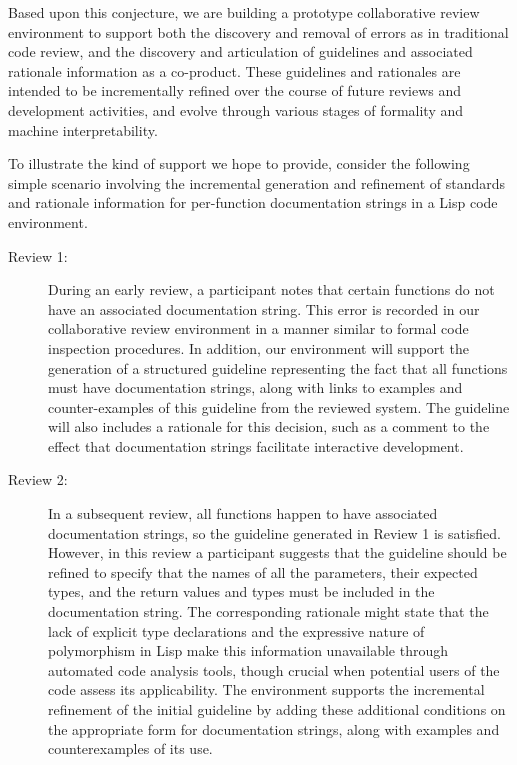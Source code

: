 Based upon this conjecture, we are building a prototype collaborative
review environment to support both the discovery and removal of errors
as in traditional code review, and the discovery and articulation of
guidelines and associated rationale information as a co-product.
These guidelines and rationales are intended to be incrementally
refined over the course of future reviews and development activities,
and evolve through various stages of formality and machine
interpretability.

To illustrate the kind of support we hope to provide, consider the
following simple scenario involving the incremental generation and
refinement of standards and rationale information for per-function
documentation strings in a Lisp code environment.

\begin{description}
  
\item[Review 1:] During an early review, a participant notes that
  certain functions do not have an associated documentation string.
  This error is recorded in our collaborative review environment in a
  manner similar to formal code inspection procedures. In addition, our
  environment will support the generation of a structured guideline
  representing the fact that all functions must have documentation
  strings, along with links to examples and counter-examples of this
  guideline from the reviewed system.  The guideline will also includes
  a rationale for this decision, such as a comment to the effect that
  documentation strings facilitate interactive development.
  
\item[Review 2:] In a subsequent review, all functions happen to
  have associated documentation strings, so the guideline generated in
  Review 1 is satisfied.  However, in this review a participant
  suggests that the guideline should be refined to specify that the
  names of all the parameters, their expected types, and the return
  values and types must be included in the documentation string.  The
  corresponding rationale might state that the lack of explicit type
  declarations and the expressive nature of polymorphism in Lisp make
  this information unavailable through automated code analysis tools,
  though crucial when potential users of the code assess its
  applicability.  The environment supports the incremental refinement
  of the initial guideline by adding these additional conditions on
  the appropriate form for documentation strings, along with examples
  and counterexamples of its use.
  

\end{description}
